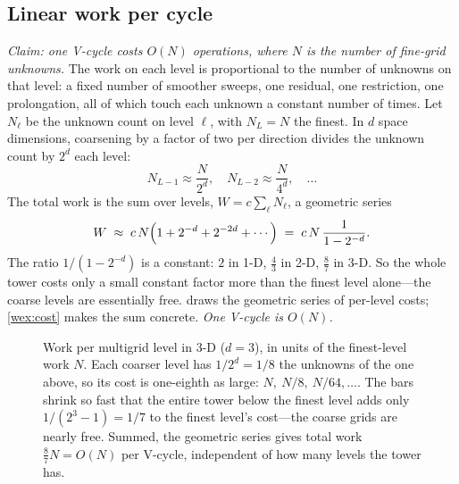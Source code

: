 \subsection{Linear work per cycle}

\emph{Claim: one V-cycle costs $O(N)$ operations, where $N$ is the number of fine-grid
unknowns.} The work on each level is proportional to the number of unknowns on that level:
a fixed number of smoother sweeps, one residual, one restriction, one prolongation, all of
which touch each unknown a constant number of times. Let $N_\ell$ be the unknown count on
level $\ell$, with $N_L = N$ the finest. In $d$ space dimensions, coarsening by a factor of
two per direction divides the unknown count by $2^d$ each level:
\[
  N_{L-1} \approx \frac{N}{2^d}, \quad N_{L-2}\approx \frac{N}{4^d}, \quad \dots
\]
The total work is the sum over levels, $W = c\sum_{\ell} N_\ell$, a geometric series
\[
  W \;\approx\; c\,N\Bigl(1 + 2^{-d} + 2^{-2d} + \cdots\Bigr)
    \;=\; c\,N\,\frac{1}{1 - 2^{-d}}.
\]
The ratio $1/(1-2^{-d})$ is a constant: $2$ in 1-D, $\tfrac43$ in 2-D, $\tfrac87$ in 3-D.
So the whole tower costs only a small constant factor more than the finest level alone---the
coarse levels are essentially free.  draws the geometric series of
per-level costs; \cref{wex:cost} makes the sum concrete. \emph{One V-cycle is $O(N)$.}

\begin{figure}[t]
\centering
{}
\caption[The per-level cost geometric series]{Work per multigrid level in 3-D ($d=3$),
in units of the finest-level work $N$. Each coarser level has $1/2^d = 1/8$ the unknowns of
the one above, so its cost is one-eighth as large: $N,\ N/8,\ N/64,\dots$. The bars shrink so
fast that the entire tower below the finest level adds only $1/(2^3-1) = 1/7$ to the finest
level's cost---the coarse grids are nearly free. Summed, the geometric series gives total
work $\tfrac{8}{7}N = O(N)$ per V-cycle, independent of how many levels the tower has.}
\label{fig:costseries}
\end{figure}

